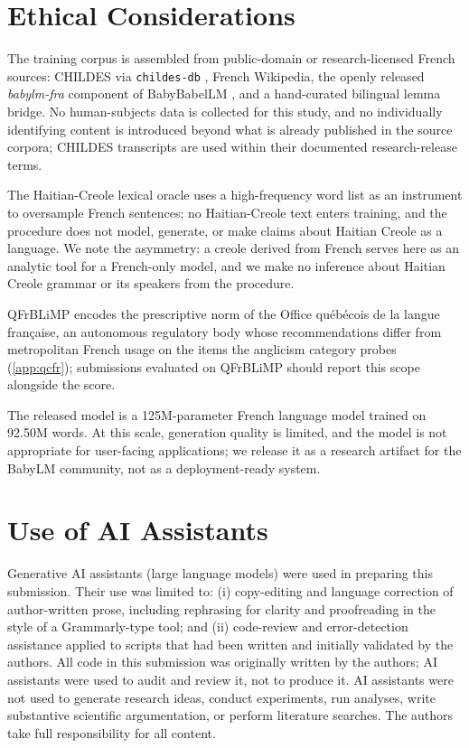 \documentclass[11pt]{article}
\begin{document}
\section*{Ethical Considerations}
\label{sec:ethics}

The training corpus is assembled from public-domain or research-licensed French sources: CHILDES via \texttt{childes-db} \citep{macwhinney2000childes}, French Wikipedia, the openly released \emph{babylm-fra} component of BabyBabelLM \citep{jumelet2026babelm}, and a hand-curated bilingual lemma bridge. No human-subjects data is collected for this study, and no individually identifying content is introduced beyond what is already published in the source corpora; CHILDES transcripts are used within their documented research-release terms.

The Haitian-Creole lexical oracle uses a high-frequency word list as an instrument to oversample French sentences; no Haitian-Creole text enters training, and the procedure does not model, generate, or make claims about Haitian Creole as a language. We note the asymmetry: a creole derived from French serves here as an analytic tool for a French-only model, and we make no inference about Haitian Creole grammar or its speakers from the procedure.

QFrBLiMP encodes the prescriptive norm of the Office qu\'eb\'ecois de la langue fran\c{c}aise, an autonomous regulatory body whose recommendations differ from metropolitan French usage on the items the anglicism category probes (\autoref{app:qcfr}); submissions evaluated on QFrBLiMP should report this scope alongside the score.

The released model is a 125M-parameter French language model trained on 92.50M words. At this scale, generation quality is limited, and the model is not appropriate for user-facing applications; we release it as a research artifact for the BabyLM community, not as a deployment-ready system.

\section*{Use of AI Assistants}

Generative AI assistants (large language models) were used in preparing this submission. Their use was limited to: (i) copy-editing and language correction of author-written prose, including rephrasing for clarity and proofreading in the style of a Grammarly-type tool; and (ii) code-review and error-detection assistance applied to scripts that had been written and initially validated by the authors. All code in this submission was originally written by the authors; AI assistants were used to audit and review it, not to produce it. AI assistants were not used to generate research ideas, conduct experiments, run analyses, write substantive scientific argumentation, or perform literature searches. 
The authors take full responsibility for all content.
\end{document}
